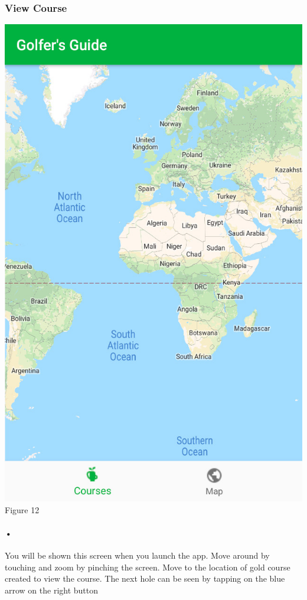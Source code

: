 \documentclass{article}
\begin{document}
	\subsubsection{View Course}
	    \includegraphics[scale=0.8]{0_overview}
	    Figure 12
	
	\paragraph{•}
	You will be shown this screen when you launch the app. Move around by touching and zoom by pinching the screen. Move to the location of gold course created to view the course. The next hole can be seen by tapping on the blue arrow on the right button
	
\end{document}
